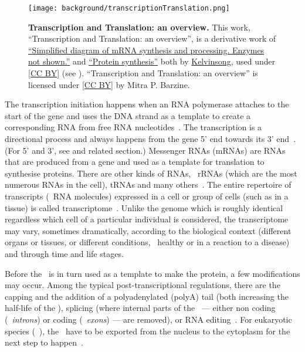 \begin{figure}[!htpb]
    \vspace{-3mm}
    \texttt{[image: background/transcriptionTranslation.png]}\centering
    \vspace{-2.3mm}
    \caption[Transcription and Translation: an overview]%
    {\label{fig:transcriptionTranslation}\textbf{Transcription and Translation: an overview.}
    {\small This work, \enquote{Transcription and Translation: an overview},
    is a derivative work of
    \href{https://commons.wikimedia.org/wiki/File:MRNA.svg}{\enquote{Simplified diagram of mRNA synthesis and processing. Enzymes not shown.}}
    and
    \href{https://commons.wikimedia.org/wiki/File:Protein\_synthesis.svg}{\enquote{Protein synthesis}}
    both by \href{https://commons.wikimedia.org/wiki/User:Kelvinsong}{Kelvinsong},
    used under \href{https://creativecommons.org/licenses/by/3.0/}{[CC BY]}
    (see ).
    \enquote{Transcription and Translation: an overview} is licensed under
    \href{https://creativecommons.org/licenses/by/4.0/}{[CC BY]} by Mitra P. Barzine.
    }}
\end{figure}

The transcription initiation happens when
an \gls{RNA} polymerase attaches to the start of the gene
and uses the \gls{DNA} strand as a template
to create a corresponding \gls{RNA}
from free \gls{RNA} nucleotides~.
The transcription is a directional process and
always happens from the gene 5' end towards its 3' end~.
(For 5' and 3', see  and related section.)
Messenger \glspl{RNA} (\glspl{mRNA}) are \glspl{RNA} that are produced from a gene
and used as a template for translation to synthesise proteins.
There are other kinds of \glspl{RNA},
\eg\ \glspl{rRNA} (which are the most numerous \glspl{RNA} in the cell),
\glspl{tRNA} and many others~.
The entire repertoire of transcripts (\ie\ \gls{RNA} molecules) expressed
in a cell or group of cells (such as in a tissue)
is called transcriptome~.
Unlike the genome which is roughly identical
regardless which cell of a particular individual is considered,
the transcriptome may vary, sometimes dramatically,
according to the biological context (different organs or tissues,
or different conditions, \eg\ healthy or in a reaction to a disease)
and through time and life stages.~

Before the \mRNA\ is in turn used as a template to make the protein,
a few modifications may occur.
Among the typical post-transcriptional regulations,
there are
the capping and the addition of a polyadenylated (polyA) tail
(both increasing the half-life of the \mRNA),
splicing
(where internal parts of the \mRNA\ ---
either non coding (\ie\ \emph{introns}) or coding (\ie\ \emph{exons}) --- are removed),
or \gls{RNA} editing~.
For eukaryotic species (\eg\ ),
the \mRNAs\ have to be exported
from the nucleus to the cytoplasm for the next step to happen~.

